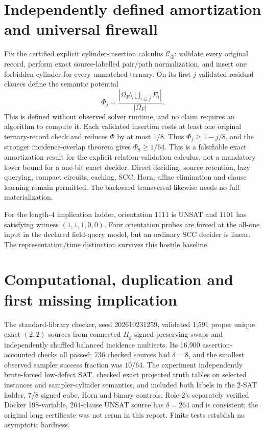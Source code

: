 \documentclass[11pt]{article}
\begin{document}
\section{Independently defined amortization and universal firewall}
Fix the certified explicit cylinder-insertion calculus $\mathcal C_\oplus$: validate every original record, perform exact source-labelled pair/path normalization, and insert one forbidden cylinder for every unmatched ternary. On its first $j$ validated residual clauses define the semantic potential
\[
\Phi_j=\frac{|\Omega_F\setminus\bigcup_{i\le j}E_i|}{|\Omega_F|}.
\]
This is defined without observed solver runtime, and no claim requires an algorithm to compute it. Each validated insertion costs at least one original ternary-record check and reduces $\Phi$ by at most $1/8$. Thus $\Phi_j\ge1-j/8$, and the stronger incidence-overlap theorem gives $\Phi_8\ge1/64$. This is a falsifiable exact amortization result for the explicit relation-validation calculus, not a mandatory lower bound for a one-bit exact decider. Direct deciding, source retention, lazy querying, compact circuits, caching, SCC, Horn, affine elimination and clause learning remain permitted. The backward transversal likewise needs no full materialization.

For the length-$4$ implication ladder, orientation $1111$ is UNSAT and $1101$ has satisfying witness $(1,1,1,0,0)$. Four orientation probes are forced at the all-one input in the declared field-query model, but an ordinary SCC decider is linear. The representation/time distinction survives this hostile baseline.

\section{Computational, duplication and first missing implication}
The standard-library checker, seed 202610231259, validated 1,591 proper unique exact-$(2,2)$ sources from connected $H_g$ signed-preserving swaps and independently shuffled balanced incidence multisets. Its 16,900 assertion-accounted checks all passed; 736 checked sources had $\delta=8$, and the smallest observed sampler success fraction was $10/64$. The experiment independently brute-forced low-defect SAT, checked exact projected truth tables on selected instances and sampler-cylinder semantics, and included both labels in the 2-SAT ladder, 7/8 signed cube, Horn and binary controls. Role-2's separately verified D\"ocker 198-variable, 264-clause UNSAT source has $\delta=264$ and is consistent; the original long certificate was not rerun in this report. Finite tests establish no asymptotic hardness.
\end{document}
